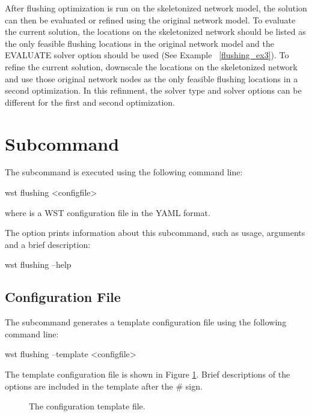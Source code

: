 After flushing optimization is run on the skeletonized network model, the  
solution can then be evaluated or refined using the original network model.  
To evaluate the current solution, the locations on the skeletonized network 
should be listed as the only feasible flushing locations  
in the original network model and the EVALUATE solver option should be used (See Example ~\ref{flushing_ex3}).   
To refine the current solution, downscale the locations on the skeletonized network
and use those original network nodes as the only feasible flushing locations  
in a second optimization. In this refinment, the solver type and  
solver options can be different for the first and second optimization.

\section{ Subcommand}

The  subcommand is executed using the following command line:
\begin{unknownListing}
wst flushing <configfile> 
\end{unknownListing}
where  is a WST configuration file in the YAML format. 

The  option prints information about this subcommand, such as usage,
arguments and a brief description:
\begin{unknownListing}
wst flushing --help
\end{unknownListing}

\subsection{Configuration File}

The  subcommand generates a template configuration file using the following command line:

\begin{unknownListing}
wst flushing --template <configfile>
\end{unknownListing}

The  template configuration file is shown in Figure \ref{fig:flushing_template}.  
Brief descriptions of the options are included in the template after the \# sign.  

\begin{figure}[p!]
  \caption{The  configuration template file.}
  \label{fig:flushing_template}
\end{figure}

